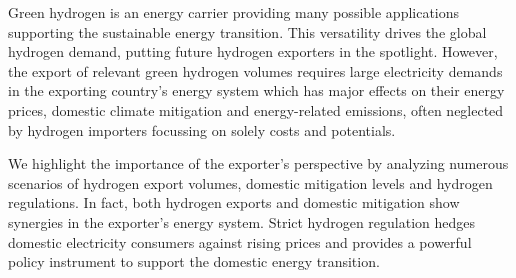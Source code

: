 
Green hydrogen is an energy carrier providing many possible applications supporting the sustainable energy transition. 
This versatility drives the global hydrogen demand, putting future hydrogen exporters in the spotlight. 
However, the export of relevant green hydrogen volumes requires large electricity demands in the exporting country's energy system which has major effects on their energy prices, domestic climate mitigation and energy-related emissions, often neglected by hydrogen importers focussing on solely costs and potentials.

We highlight the importance of the exporter's perspective by analyzing numerous scenarios of hydrogen export volumes, domestic mitigation levels and hydrogen regulations. In fact, both hydrogen exports and domestic mitigation show synergies in the exporter's energy system. 
Strict hydrogen regulation hedges domestic electricity consumers against rising prices and provides a powerful policy instrument to support the domestic energy transition.


